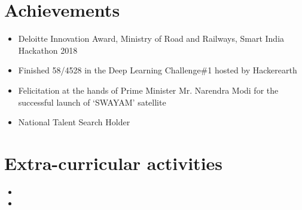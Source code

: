 \documentclass[10pt,a4paper,sans]{moderncv}        %
\begin{document}
\section{Achievements}

\vspace{3pt}

\begin{itemize}

\item{Deloitte Innovation Award, Ministry of Road and Railways, Smart India Hackathon 2018}
\item{Finished 58/4528 in the Deep Learning Challenge\#1 hosted by Hackerearth}
\item{Felicitation at the hands of Prime Minister Mr. Narendra Modi for the successful launch of `SWAYAM' satellite}

\item{National Talent Search Holder}




\end{itemize}

\section{Extra-curricular activities}


\vspace{4pt}
 
 \begin{itemize}

	 \item{}

	 \item{}
 \end{itemize}


 
\end{document}
